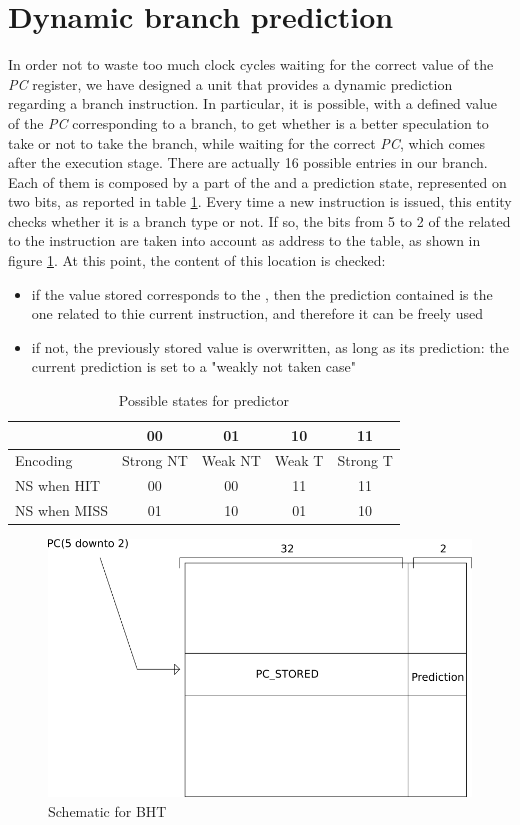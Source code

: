 \section{Dynamic branch prediction}
\label{dyn_br}
In order not to waste too much clock cycles waiting for the correct value of the \textit{PC} register, we have designed a unit that provides a dynamic prediction regarding a branch instruction. In particular, it is possible, with a defined value of the \textit{PC} corresponding to a branch, to get whether is a better speculation to take or not to take the branch, while waiting for the correct \textit{PC}, which comes after the execution stage. 
There are actually 16 possible entries in our branch. Each of them is composed by a part of the \pc and a prediction state, represented on two bits, as reported in table \ref{pred_tab}. Every time a new instruction is issued, this entity checks whether it is a branch type or not. If so, the bits from 5 to 2 of the \pc related to the instruction are taken into account as address to the table, as shown in figure \ref{bht_fig}. At this point, the content of this location is checked:
\begin{itemize}
	\item if the value stored corresponds to the \pc, then the prediction contained is the one related to thie current instruction, and therefore it can be freely used
	\item if not, the previously stored value is overwritten, as long as its prediction: the current prediction is set to a "weakly not taken case"
\end{itemize}

\begin{table}[]
	\centering
	\begin{tabular}{l|cccc}
		\toprule
		& 00        & 01      & 10     & 11       \\
		\toprule
		Encoding     & Strong NT & Weak NT & Weak T & Strong T \\
		\midrule
		NS when HIT  & 00        & 00      & 11     & 11       \\
		NS when MISS & 01        & 10      & 01     & 10      	\\
		\bottomrule
	\end{tabular}
\caption{Possible states for predictor}
\label{pred_tab}
\end{table}


\begin{figure}
	\centering
	\includegraphics[scale=0.5]{chapters/figures/bht}
	\caption{Schematic for BHT}
	\label{bht_fig}
\end{figure}
